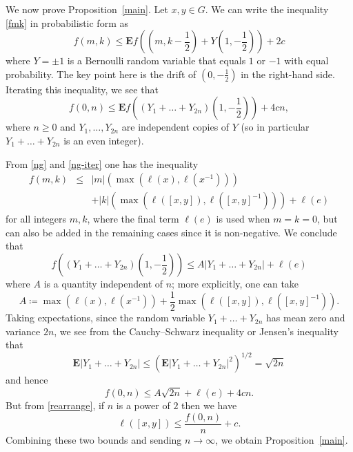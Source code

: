 \documentclass[11pt,a4paper,reqno]{amsart}
\numberwithin{equation}{section}
\theoremstyle{plain}
\theoremstyle{definition}
\newtheorem{remark}[equation]{Remark}
\newcommand\norm[1]{\ell({#1})}   %
\begin{document}
We now prove Proposition~\ref{main}. Let $x,y \in G$.  We can
write the inequality \eqref{fmk} in probabilistic form as
\[
f(m,k) \leq {\mathbf E} f\left( \left(m,k-\frac{1}{2}\right) + Y
\left(1,-\frac{1}{2}\right) \right) + { 2 c}
\]
where $Y = \pm 1$ is a Bernoulli random variable that equals $1$ or $-1$
with equal probability.  The key point here is the drift of $\left(0,
-\frac{1}{2} \right)$ in the right-hand side.
Iterating this inequality, we see that
\[
f( 0, n) \leq {\mathbf E} f\left( (Y_1 + \dots + Y_{2n}) \left(1,
-\frac{1}{2}\right) \right) + { 4 c n},
\]
where $n \geq 0$ and $Y_1,\dots,Y_{2n}$ are independent copies of $Y$ (so
in particular $Y_1+\dots+Y_{2n}$ is an even integer).

From \eqref{ng} and \eqref{ng-iter} one has the inequality
\begin{eqnarray*}
f(m,k) & \leq &
|m| \left(\max( \norm{x}, \norm{x^{-1}}) \right)\\
& & + |k| \left(\max(
\norm{[x,y]}, \norm{[x,y]^{-1}}) \right) + \norm{e}
\end{eqnarray*}
for all integers $m,k$, where the final term $\norm{e}$ is used when
$m=k=0$, { but can also be added in the remaining cases since
it is non-negative}.  We conclude that
\[
f\left( (Y_1 + \dots + Y_{2n}) \left(1, -\frac{1}{2}\right) \right) \leq
A |Y_1 + \dots + Y_{2n}| + \norm{e}
\]
where $A$ is a quantity independent of $n$; more explicitly, one can take
\[
A \coloneqq \max\left( \norm{x}, \norm{x^{-1}}\right) + \frac{1}{2}
\max\left(\norm{[x,y]}, \norm{[x,y]^{-1}}\right).
\]
Taking expectations, since the random variable $Y_1+\dots+Y_{2n}$ has
mean zero and variance $2n$, we see from the Cauchy--Schwarz inequality
or Jensen's inequality that
\[
{\mathbf E}|Y_1 + \dots + Y_{2n}|  \leq \left( {\mathbf E}|Y_1 + \dots +
Y_{2n}|^2 \right)^{1/2} = \sqrt{2n}
\]
and hence
\[
f(0,n) \leq A \sqrt{2n} + \norm{e} + { 4 c n}.
\]
But from \eqref{rearrange}, if $n$ is a power of $2$ then we have
\[
\norm{[x,y]} \leq \frac{f(0,n)}{n}  + { c}.
\]
Combining these two bounds and sending $n \to \infty$, we obtain
Proposition~\ref{main}.


\end{document}
